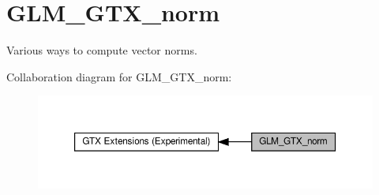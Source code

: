 \hypertarget{group__gtx__norm}{}\section{G\+L\+M\+\_\+\+G\+T\+X\+\_\+norm}
\label{group__gtx__norm}


Various ways to compute vector norms.  


Collaboration diagram for G\+L\+M\+\_\+\+G\+T\+X\+\_\+norm\+:\nopagebreak
\begin{figure}[H]
\begin{center}
\leavevmode
\includegraphics[width=350pt]{group__gtx__norm}
\end{center}
\end{figure}
